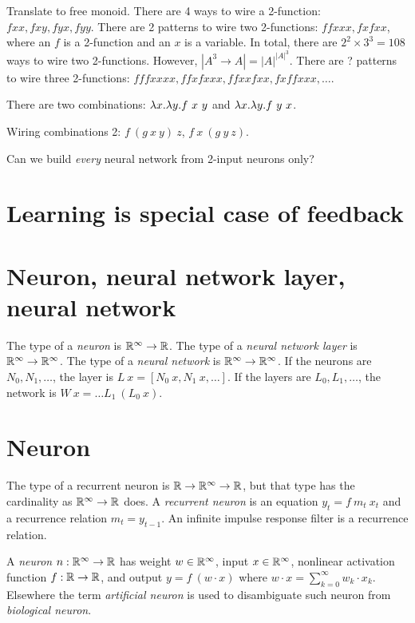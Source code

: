 Translate to free monoid.
There are 4 ways to wire a 2-function: \( fxx, fxy, fyx, fyy \).
There are 2 patterns to wire two 2-functions: \( ffxxx, fxfxx \),
where an \(f\) is a 2-function and an \(x\) is a variable.
In total, there are \( 2^2 \times 3^3 = 108 \) ways to wire two 2-functions.
However, \( |A^3 \to A| = |A|^{|A|^3} \).
There are ? patterns to wire three 2-functions: \( fffxxxx, ffxfxxx, ffxxfxx, fxffxxx, \ldots \).

There are two combinations: \(\lambda x. \lambda y. f~x~y\) and \(\lambda x. \lambda y. f~y~x\).

Wiring combinations 2: \(f~(g~x~y)~z\), \(f~x~(g~y~z)\).

Can we build \emph{every} neural network from 2-input neurons only?

\section{Learning is special case of feedback}

\section{Neuron, neural network layer, neural network}

%
%
%
The type of a \emph{neuron} is \(\mathbb{R}^\infty \to \mathbb{R}\).
The type of a \emph{neural network layer} is \(\mathbb{R}^\infty \to \mathbb{R}^\infty\).
The type of a \emph{neural network} is \(\mathbb{R}^\infty \to \mathbb{R}^\infty\).
If the neurons are \(N_0,N_1,\ldots\), the layer is \(L~x = [N_0~x, N_1~x, \ldots]\).
If the layers are \(L_0,L_1,\ldots\), the network is \(W~x = \ldots L_1~(L_0~x) \).

\section{Neuron}

The type of a recurrent neuron is \(\mathbb{R} \to \mathbb{R}^\infty \to \mathbb{R}\),
but that type has the cardinality as \(\mathbb{R}^\infty \to \mathbb{R}\) does.
A \emph{recurrent neuron} is an equation \(y_t = f~m_t~x_t\)
and a recurrence relation \(m_t = y_{t-1}\).
An infinite impulse response filter is a recurrence relation.

A \emph{neuron} \(n : \mathbb{R}^\infty \to \mathbb{R}\)
has weight \(w \in \mathbb{R}^\infty\), input \(x \in \mathbb{R}^\infty\),
nonlinear activation function \(f : \mathbb{R} \to \mathbb{R}\),
and output \(y = f~(w \cdot x)\) where \(w \cdot x = \sum_{k=0}^\infty w_k \cdot x_k\).
Elsewhere the term \emph{artificial neuron} is used to disambiguate
such neuron from \emph{biological neuron}.


